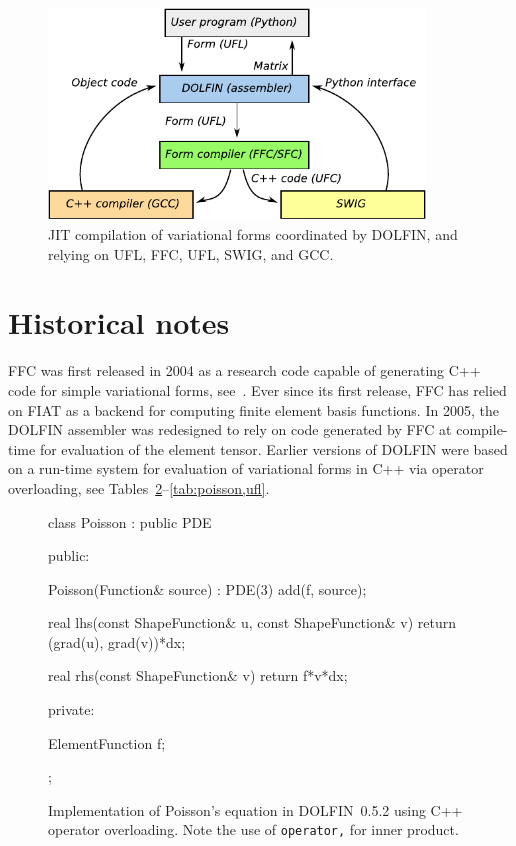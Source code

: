 \begin{figure}
  \begin{center}
    \includegraphics[width=10cm]{chapters/logg-1/pdf/jit.pdf}
    \caption{JIT compilation of variational forms coordinated by
      DOLFIN, and relying on UFL, FFC, UFL, SWIG, and GCC.}
    \label{fig:jit}
  \end{center}
\end{figure}

\section{Historical notes}

FFC was first released in 2004 as a research code capable of
generating C++ code for simple variational forms,
see~\cite{KirbyLogg2006,KirbyLogg2007}. Ever since its first release,
FFC has relied on FIAT as a backend for computing finite element basis
functions. In 2005, the DOLFIN assembler was redesigned to rely on
code generated by FFC at compile-time for evaluation of the element
tensor. Earlier versions of DOLFIN were based on a run-time system for
evaluation of variational forms in C++ via operator overloading, see
Tables~\ref{tab:poisson,before}--\ref{tab:poisson,ufl}.

\begin{figure}
  \begin{center}
\begin{code}
  class Poisson : public PDE
  {
  public:

    Poisson(Function& source) : PDE(3)
    {
      add(f, source);
    }

    real lhs(const ShapeFunction& u, const ShapeFunction& v)
    {
      return (grad(u), grad(v))*dx;
    }

    real rhs(const ShapeFunction& v)
    {
      return f*v*dx;
    }

  private:

    ElementFunction f;

  };
\end{code}
  \caption{Implementation of Poisson's equation in DOLFIN~0.5.2 using C++ operator overloading.
           Note the use of \texttt{operator,} for inner product.}
  \label{tab:poisson,before}
  \end{center}
\end{figure}

